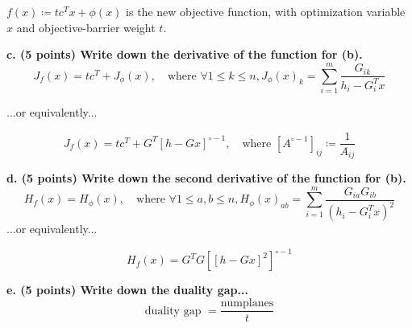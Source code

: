 \documentclass[a4paper,10pt]{article}
\theoremstyle{definition}
\begin{document}
$f(x) \coloneq tc^Tx + \phi(x)$ is the new objective function,
with optimization variable $x$ and objective-barrier weight $t$.

\textbf{c. (5 points) Write down the derivative of the function for (b).}
\[
    J_f(x) = tc^T + J_{\phi}(x), \quad \text{where } \forall 1\leq k\leq n,
    J_{\phi}(x)_k = \sum_{i=1}^{m} \frac{G_{ik}}{h_i - G^T_i x}
\]

...or equivalently...

\[
    J_f(x) = tc^T + G^T[h - Gx]^{\circ -1}, \quad\text{where } [A^{\circ-1}]_{ij} \coloneq \frac{1}{A_{ij}}
\]

\textbf{d. (5 points) Write down the second derivative of the function for (b).}
\[
    H_f(x) = H_{\phi}(x), \quad \text{where } \forall 1\leq a,b \leq n,
    H_{\phi}(x)_{ab} = \sum_{i=1}^{m} \frac{G_{ia}G_{ib}}{(h_i - G^T_i x)^2}
\]
...or equivalently...

\[
    H_f(x) = G^TG[[h - Gx]^2]^{\circ -1}
\]

\textbf{e. (5 points) Write down the duality gap...}
\[
    \text{duality gap } = \frac {\text{numplanes}}{t}
\]
\end{document}
